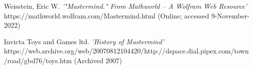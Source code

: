 \documentclass[12pt]{article}  %
\theoremstyle{definition}
\theoremstyle{remark}
\begin{document}
%
%
%
\begin{thebibliography}{99}

% 
%



%

%




Weisstein, Eric W.
{\em '"Mastermind." From Mathworld -- A Wolfram Web Resource'}
https://mathworld.wolfram.com/Mastermind.html
(Online; accessed 9-November-2022)

Invicta Toys and Games ltd.
{\em 'History of Mastermind'}
https://web.archive.org/web/20070812104420/http://dspace.dial.pipex.com/town/road/gbd76/toys.htm
(Archived 2007)


\end{thebibliography}
\end{document}
